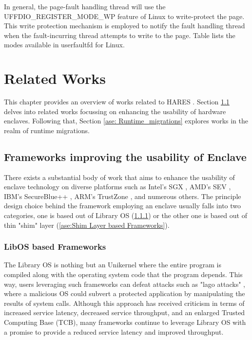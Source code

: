 \documentclass[article, doublespace,nopageskip]{VTthesis} %
\newcommand{\monitor}{HARES }
\begin{document}
     In general, the page-fault handling thread will use the UFFDIO\_REGISTER\_MODE\_WP feature of Linux to write-protect the page. This write protection mechanism is employed to notify the fault handling thread when the fault-incurring thread attempts to write to the page. Table lists the modes available in userfaultfd for Linux.
     
    \chapter{Related Works} \label{ch:rel_works}
    This chapter provides an overview of works related to \monitor. Section \ref{ase:frameworks_to_improve_usability} delves into related works focussing on enhancing the usability of hardware enclaves. Following that, Section \ref{ase: Runtime_migrations} explores works in the realm of runtime migrations.

    \section{Frameworks improving the usability of Enclave} \label{ase:frameworks_to_improve_usability}
    There exists a substantial body of work that aims to enhance the usability of enclave technology on diverse platforms such as Intel's SGX \cite{Intel-SGX}, AMD's SEV \cite{AMD-SEV}, IBM's SecureBlue++ \cite{IBM-Secure_Blue}, ARM's TrustZone \cite{ARM-TrustZone}, and numerous others. The principle design choice behind the framework employing an enclave usually falls into two categories, one is based out of Library OS (\ref{ase:LibOS based Frameworks}) or the other one is based out of thin "shim" layer (\ref{ase:Shim Layer based Frameworks}). 

    \subsection{LibOS based Frameworks} \label{ase:LibOS based Frameworks}
    The Library OS is nothing but an Unikernel \cite{Unikernel} where the entire program is compiled along with the operating system code that the program depends. This way, users leveraging such frameworks can defeat attacks such as "lago attacks" \cite{lago}, where a malicious OS could subvert a protected application by manipulating the results of system calls. Although this approach has received criticism in terms of increased service latency, decreased service throughput, and an enlarged Trusted Computing Base (TCB), many frameworks continue to leverage Library OS with a promise to provide a reduced service latency and improved throughput. 
\end{document}
